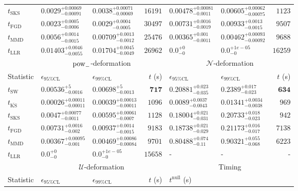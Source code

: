 \begin{tabular}{l|llr|llr}
	$t_{\mathrm{SKS}}$ & $0.0029_{-0.00091}^{+0.00069}$ & $0.0038_{-0.00069}^{+0.00071}$ & $16191$ & $0.00478_{-0.0011}^{+0.00081}$ & $0.00605_{-0.00075}^{+0.00062}$ & $1123$ \\
	$t_{\mathrm{FGD}}$ & ${\mathbf{0.0023_{-0.0006}^{+0.0005}}}$ & ${\mathbf{0.0029_{-0.0005}^{+0.0004}}}$ & $30497$ & $0.00731_{-0.0019}^{+0.0016}$ & $0.00933_{-0.0015}^{+0.0013}$ & $9507$ \\
	$t_{\mathrm{MMD}}$ & $0.0056_{-0.0015}^{+0.0014}$ & $0.00709_{-0.0012}^{+0.0013}$ & $25476$ & $0.00365_{-0.0011}^{+0.001}$ & $0.00462_{-0.00092}^{+0.00093}$ & $9688$ \\
	$t_{\mathrm{LLR}}$ & $0.01403_{-0.0055}^{+0.0046}$ & $0.01704_{-0.0049}^{+0.0045}$ & $26962$ & $0.0_{-0}^{+0}$ & $0.0_{-0}^{+1e-05}$ & $16259$ \\
	\toprule
	\multicolumn{1}{c}{} & \multicolumn{3}{c}{$\rm{pow}_{-}$-deformation} & \multicolumn{3}{c}{$\mathcal{N}$-deformation} \\
	Statistic & $\epsilon_{95\%\mathrm{CL}}$ & $\epsilon_{99\%\mathrm{CL}}$ & $t$ (s) & $\epsilon_{95\%\mathrm{CL}}$ & $\epsilon_{99\%\mathrm{CL}}$ & $t$ (s) \\
	\midrule
	$t_{\mathrm{SW}}$ & $0.00536_{-0.0016}^{+5}$ & $0.00698_{-0.0013}^{+5}$ & ${\mathbf{717}}$ & $0.20881_{-0.035}^{+0.023}$ & $0.2389_{-0.023}^{+0.017}$ & ${\mathbf{634}}$ \\
	$t_{\overline{\mathrm{KS}}}$ & ${\mathbf{0.00026_{-0.00011}^{+0.00011}}}$ & ${\mathbf{0.00039_{-0.00011}^{+0.00013}}}$ & $1096$ & ${\mathbf{0.0089_{-0.0043}^{+0.0037}}}$ & ${\mathbf{0.01341_{-0.0038}^{+0.0034}}}$ & $969$ \\
	$t_{\mathrm{SKS}}$ & $0.0047_{-0.0011}^{+0.00077}$ & $0.00595_{-0.0007}^{+0.00061}$ & $1128$ & $0.18004_{-0.031}^{+0.021}$ & $0.20733_{-0.023}^{+0.018}$ & $942$ \\
	$t_{\mathrm{FGD}}$ & $0.00731_{-0.002}^{+0.0016}$ & $0.00937_{-0.0015}^{+0.0014}$ & $9183$ & $0.18738_{-0.029}^{+0.021}$ & $0.21173_{-0.017}^{+0.016}$ & $7138$ \\
	$t_{\mathrm{MMD}}$ & $0.00367_{-0.001}^{+0.00095}$ & $0.00469_{-0.00084}^{+0.00086}$ & $9701$ & $0.80488_{-0.11}^{+0.074}$ & $0.90321_{-0.068}^{+0.055}$ & $6223$ \\
	$t_{\mathrm{LLR}}$ & $0.0_{-0}^{+0}$ & $0.0_{-0}^{+1e-05}$ & $15658$ & - & - & - \\
	\toprule
	\multicolumn{1}{c}{} & \multicolumn{3}{c}{$\mathcal{U}$-deformation} & \multicolumn{3}{c}{Timing} \\
	Statistic & $\epsilon_{95\%\mathrm{CL}}$ & $\epsilon_{99\%\mathrm{CL}}$ & $t$ (s) & $t^{\mathrm{null}}$ (s) \\

\end{tabular}
